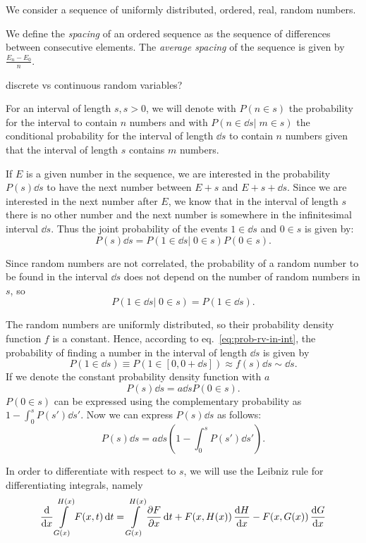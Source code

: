 \documentclass[../thesis.tex]{subfiles}
\theoremstyle{definition}
\begin{document}
We consider a sequence of uniformly distributed, ordered, real, random numbers.

{\color{red}
We define the \emph{spacing} of an ordered sequence as the sequence of
differences between consecutive elements.
The \emph{average spacing} of the sequence is given by \(\frac{E_n-E_0}{n}\).

discrete vs continuous random variables?
}

For an interval of length \(s, s>0\), we will denote with \( P(n \in s) \) the probability
for the interval to contain $n$ numbers and with \( P(n \in \dd{s} |\; m \in s) \)
the conditional probability for the interval of length \( \dd{s} \) to contain
$n$ numbers given that the interval of length $s$ contains $m$ numbers.

If $E$ is a given number in the sequence, we are interested in the probability
\( P(s)\dd{s} \) to have the next number between \( E+s \) and \( E+s+\dd{s} \).
Since we are interested in the next number after $E$, we know that in the
interval of length $s$ there is no other number and the next number is somewhere
in the infinitesimal interval \(\dd{s}\). Thus the joint probability of
the events \(1 \in \dd{s}\) and \(0 \in s\) is given by:
\begin{equation}
  \label{eq:jpr-next}
  P(s)\dd{s} = P(1 \in \dd{s} |\; 0 \in s) P(0 \in s).
\end{equation}

Since random numbers are not correlated, the probability of a random number to be found
in the interval \( \dd{s} \) does not depend on the number of random numbers in $s$, so
\[
  P(1 \in \dd{s} |\; 0 \in s) = P(1 \in \dd{s}).
\]

The random numbers are uniformly distributed, so their probability density function
\(f\) is a constant. Hence, according to eq.~\eqref{eq:prob-rv-in-int}, the probability
of finding a number in the interval of length \( \dd{s} \) is given by
\[
  P(1 \in \dd{s}) \equiv P(1 \in [0, 0+\dd{s}]) \approx f(s) \dd{s} \sim \dd{s}.
\]
If we denote the constant probability density function with $a$
\[
  P(s)\dd{s} = a \dd{s} P(0 \in s).
\]
\( P(0 \in s) \) can be expressed using the complementary probability as
\( {1 - \int_0^s P(s') \dd{s'}} \). Now we can express \( P(s)\dd{s} \) as follows:
\[
  P(s)\dd{s} = a \dd{s} \left( 1 - \int_0^s P(s') \dd{s'} \right).
\]

In order to differentiate with respect to $s$, we will use the Leibniz rule
for differentiating integrals, namely
\begin{equation}
  \label{eq:leibnitz}
  \dv{x} \int\limits_{G(x)}^{H(x)} F(x, t) \dd{t} = \int\limits_{G(x)}^{H(x)} \pdv{F}{x} \dd{t}
  + F(x, H(x))\, \dv{H}{x} - F(x, G(x))\, \dv{G}{x}
\end{equation}
\end{document}
